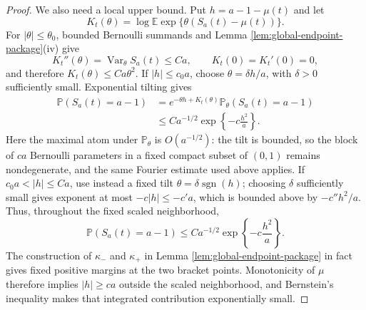 \documentclass[11pt]{article}
\theoremstyle{remark}
\newcommand{\Pp}{\mathbb P}
\newcommand{\Ee}{\mathbb E}
\newcommand{\Var}{\operatorname{Var}}
\begin{document}
\begin{proof}
We also need a local upper bound.  Put $h=a-1-\mu(t)$ and let
\[
        K_t(\theta)=\log\Ee\exp\{\theta(S_a(t)-\mu(t))\}.
\]
For $|\theta|\le\theta_0$, bounded Bernoulli summands and Lemma
\ref{lem:global-endpoint-package}(iv) give
\[
        K_t''(\theta)=\Var_\theta S_a(t)\le Ca,
        \qquad K_t(0)=K_t'(0)=0,
\]
and therefore $K_t(\theta)\le Ca\theta^2$.  If $|h|\le c_0a$, choose
$\theta=\delta h/a$, with $\delta>0$ sufficiently small.  Exponential tilting
gives
\[
\begin{aligned}
        \Pp(S_a(t)=a-1)
        &=e^{-\theta h+K_t(\theta)}
          \Pp_\theta(S_a(t)=a-1)\\
        &\le Ca^{-1/2}
          \exp\left\{-c\frac{h^2}{a}\right\}.
\end{aligned}
\]
Here the maximal atom under $\Pp_\theta$ is $O(a^{-1/2})$: the tilt is bounded,
so the block of $ca$ Bernoulli parameters in a fixed compact subset of
$(0,1)$ remains nondegenerate, and the same Fourier estimate used above
applies.  If $c_0a<|h|\le Ca$, use instead a fixed tilt
$\theta=\delta\operatorname{sgn}(h)$; choosing $\delta$ sufficiently small
gives exponent at most $-c|h|\le-c'a$, which is bounded above by
$-c''h^2/a$.  Thus, throughout the fixed scaled neighborhood,
\begin{equation}
        \Pp(S_a(t)=a-1)
        \le Ca^{-1/2}\exp\left\{-c\frac{h^2}{a}\right\}.
\label{eq:global-one-gaussian-upper}
\end{equation}
The construction of $\kappa_-$ and $\kappa_+$ in Lemma
\ref{lem:global-endpoint-package} in fact gives fixed positive margins at the
two bracket points.  Monotonicity of $\mu$ therefore implies $|h|\ge ca$
outside the scaled neighborhood, and Bernstein's inequality makes that
integrated contribution exponentially small.


\end{proof}
\end{document}
